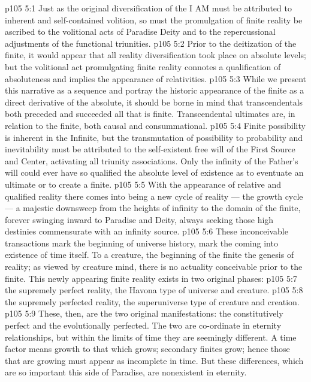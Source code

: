 \vs p105 5:1 Just as the original diversification of the I AM must be attributed to inherent and self\hyp{}contained volition, so must the promulgation of finite reality be ascribed to the volitional acts of Paradise Deity and to the repercussional adjustments of the functional triunities.
\vs p105 5:2 Prior to the deitization of the finite, it would appear that all reality diversification took place on absolute levels; but the volitional act promulgating finite reality connotes a qualification of absoluteness and implies the appearance of relativities.
\vs p105 5:3 \pc While we present this narrative as a sequence and portray the historic appearance of the finite as a direct derivative of the absolute, it should be borne in mind that transcendentals both preceded and succeeded all that is finite. Transcendental ultimates are, in relation to the finite, both causal and consummational.
\vs p105 5:4 \pc Finite possibility is inherent in the Infinite, but the transmutation of possibility to probability and inevitability must be attributed to the self\hyp{}existent free will of the First Source and Center, activating all triunity associations. Only the infinity of the Father’s will could ever have so qualified the absolute level of existence as to eventuate an ultimate or to create a finite.
\vs p105 5:5 With the appearance of relative and qualified reality there comes into being a new cycle of reality --- the growth cycle --- a majestic downsweep from the heights of infinity to the domain of the finite, forever swinging inward to Paradise and Deity, always seeking those high destinies commensurate with an infinity source.
\vs p105 5:6 These inconceivable transactions mark the beginning of universe history, mark the coming into existence of time itself. To a creature, the beginning of the finite  the genesis of reality; as viewed by creature mind, there is no actuality conceivable prior to the finite. This newly appearing finite reality exists in two original phases:
\vs p105 5:7 \bibnobreakspace {} the supremely perfect reality, the Havona type of universe and creature.
\vs p105 5:8 \bibnobreakspace {} the supremely perfected reality, the superuniverse type of creature and creation.
\vs p105 5:9 \pc These, then, are the two original manifestations: the constitutively perfect and the evolutionally perfected. The two are co\hyp{}ordinate in eternity relationships, but within the limits of time they are seemingly different. A time factor means growth to that which grows; secondary finites grow; hence those that are growing must appear as incomplete in time. But these differences, which are so important this side of Paradise, are nonexistent in eternity.
